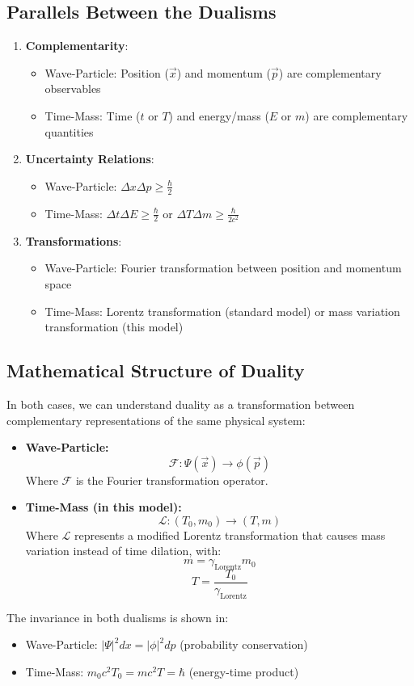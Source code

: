 \documentclass[a4paper,12pt]{article}
\newcommand{\Tzero}{T_0}
\newcommand{\vecx}{\vec{x}}
\newcommand{\gammaf}{\gamma_{\text{Lorentz}}}
\begin{document}
	\subsection{Parallels Between the Dualisms}
	\begin{enumerate}[leftmargin=*,nosep]
		\item \textbf{Complementarity}: 
		\begin{itemize}[leftmargin=*,nosep]
			\item Wave-Particle: Position ($\vecx$) and momentum ($\vec{p}$) are complementary observables
			\item Time-Mass: Time ($t$ or $T$) and energy/mass ($E$ or $m$) are complementary quantities
		\end{itemize}
		\item \textbf{Uncertainty Relations}:
		\begin{itemize}[leftmargin=*,nosep]
			\item Wave-Particle: $\Delta x \Delta p \geq \frac{\hbar}{2}$
			\item Time-Mass: $\Delta t \Delta E \geq \frac{\hbar}{2}$ or $\Delta T \Delta m \geq \frac{\hbar}{2c^2}$
		\end{itemize}
		\item \textbf{Transformations}:
		\begin{itemize}[leftmargin=*,nosep]
			\item Wave-Particle: Fourier transformation between position and momentum space
			\item Time-Mass: Lorentz transformation (standard model) or mass variation transformation (this model)
		\end{itemize}
	\end{enumerate}
	
	\subsection{Mathematical Structure of Duality}
	In both cases, we can understand duality as a transformation between complementary representations of the same physical system:
	\begin{itemize}[leftmargin=*,nosep]
		\item \textbf{Wave-Particle:} 
		\[
		\mathcal{F}: \Psi(\vecx) \rightarrow \phi(\vec{p})
		\]
		Where $\mathcal{F}$ is the Fourier transformation operator.
		\item \textbf{Time-Mass (in this model):} 
		\[
		\mathcal{L}: (\Tzero, m_0) \rightarrow (T, m)
		\]
		Where $\mathcal{L}$ represents a modified Lorentz transformation that causes mass variation instead of time dilation, with:
		\[
		m = \gammaf m_0
		\]
		\[
		T = \frac{\Tzero}{\gammaf}
		\]
	\end{itemize}
	The invariance in both dualisms is shown in:
	\begin{itemize}[leftmargin=*,nosep]
		\item Wave-Particle: $|\Psi|^2 dx = |\phi|^2 dp$ (probability conservation)
		\item Time-Mass: $m_0c^2\Tzero = mc^2T = \hbar$ (energy-time product)
	\end{itemize}
	
\end{document}
